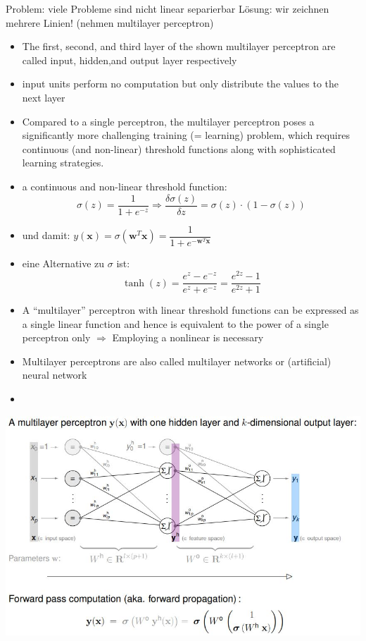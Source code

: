 \documentclass[11pt,a4paper]{article}
\begin{document}
\begin{flushleft}
Problem: viele Probleme sind nicht linear separierbar
Lösung: wir zeichnen mehrere Linien! (nehmen multilayer perceptron)
\begin{itemize}
\item The first, second, and third layer of the shown multilayer perceptron are called input, hidden,and output layer respectively
\item  input units perform no computation but only distribute the values to the next
layer
\item Compared to a single perceptron, the multilayer perceptron poses a significantly more
challenging training (= learning) problem, which requires continuous (and non-linear)
threshold functions along with sophisticated learning strategies.
\item a continuous and non-linear threshold function: 
$$ \sigma(z) = \frac{1}{1+ e^{-z}} \Rightarrow \frac{\delta \sigma (z)}{\delta z} = \sigma(z) \cdot (1- \sigma(z)) $$
\item und damit: $ y(\textbf{x}) = \sigma (\textbf{w}^T\textbf{x}) = \dfrac{1}{1+e^{-\textbf{w}^T\textbf{x}}} $
\item eine Alternative zu $\sigma$ ist: \\
$$ \tanh (z) = \frac{e^z - e^{-z}}{e^z + e^{-z}} = \frac{e^{2z}-1}{e^{2z}+1}$$ 
\item A “multilayer” perceptron with linear threshold functions can be expressed as a single linear
function and hence is equivalent to the power of a single perceptron only $\Rightarrow$ Employing a nonlinear is necessary
\item  Multilayer perceptrons are also called multilayer networks or (artificial) neural network
\item 
\end{itemize}
\includegraphics[width=\textwidth]{MP}

\end{flushleft}
\end{document}
